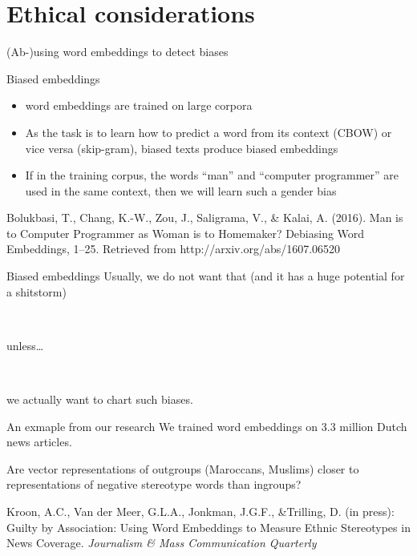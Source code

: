 \documentclass[compress]{beamer}
\begin{document}
\section{Ethical considerations}

\begin{frame}[plain]
	(Ab-)using word embeddings to detect biases
\end{frame}

\begin{frame}{Biased embeddings}
	\begin{itemize}
		\item word embeddings are trained on large corpora
		\item As the task is to learn how to predict a word from its context (CBOW) or vice versa (skip-gram), biased texts produce biased embeddings
		\item If in the training corpus, the words ``man'' and ``computer programmer'' are used in the same context, then we will learn such a gender bias
	\end{itemize}
	
	\tiny{Bolukbasi, T., Chang, K.-W., Zou, J., Saligrama, V., \& Kalai, A. (2016). Man is to Computer Programmer as Woman is to Homemaker? Debiasing Word Embeddings, 1–25. Retrieved from http://arxiv.org/abs/1607.06520}
\end{frame}


\begin{frame}{Biased embeddings}
	Usually, we do not want that (and it has a huge potential for a shitstorm)
	
	~\\
	\pause
	
	unless\ldots
	
	~\\
	\pause
	
	we actually want to chart such biases.
	
\end{frame}


\begin{frame}{An exmaple from our research}
We trained word embeddings on 3.3 million Dutch news articles.
	
Are vector representations of outgroups (Maroccans, Muslims) closer to representations of negative stereotype words than ingroups?
\vspace{.5cm}
	
\tiny{Kroon, A.C., Van der Meer, G.L.A., Jonkman, J.G.F., \&Trilling, D. (in press): Guilty by Association: Using Word Embeddings to Measure Ethnic Stereotypes in News Coverage. \emph{Journalism \& Mass
			Communication Quarterly}}
\end{frame}
\end{document}
